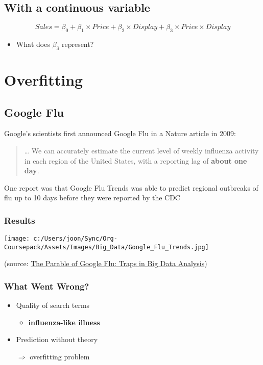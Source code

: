 \documentclass[10pt,article]{article}
\begin{document}
\subsection{With a continuous variable}
\label{sec:org96e1753}

\[  Sales = \beta_0 + \beta_1 \times Price + \beta_2 \times Display + \beta_3 \times Price \times Display \]
\begin{itemize}
\item What does \(\beta_3\) represent?
\end{itemize}
\clearpage
\section{Overfitting}
\label{sec:orged09ad6}
\subsection{Google Flu}
\label{sec:org58d525d}
Google's scientists first announced Google Flu in a Nature article in 2009:

\begin{quote}
\ldots{} We can accurately estimate the current level of weekly influenza activity
in each region of the United States, with a reporting lag of \textbf{about one day}.
\end{quote}

One report was that Google Flu Trends was able to predict regional
outbreaks of flu up to 10 days before they were reported by the CDC

\subsubsection{Results}
\label{sec:org034a9b3}
\begin{center}
\texttt{[image: c:/Users/joon/Sync/Org-Coursepack/Assets/Images/Big\_Data/Google\_Flu\_Trends.jpg]}
\end{center}

(source: \href{http://www.uvm.edu/\~cdanfort/csc-reading-group/lazer-flu-science-2014.pdf}{The Parable of Google Flu: Traps in Big Data Analysis})

\subsubsection{What Went Wrong?}
\label{sec:orgb8095aa}

\begin{itemize}
\item Quality of search terms

\begin{itemize}
\item \textbf{influenza-like illness}
\end{itemize}

\item Prediction without theory

\(\Rightarrow\) overfitting problem
\end{itemize}
\end{document}
